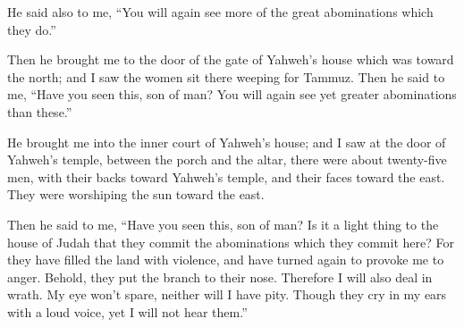 {He said also to me, “You will again see more of the great abominations which they do.”
\par }{\PP {}Then he brought me to the door of the gate of Yahweh’s house which was toward the north; and I saw the women sit there weeping for Tammuz.
Then he said to me, “Have you seen this, son of man? You will again see yet greater abominations than these.”
\par }{\PP {}He brought me into the inner court of Yahweh’s house; and I saw at the door of Yahweh’s temple, between the porch and the altar, there were about twenty-five men, with their backs toward Yahweh’s temple, and their faces toward the east. They were worshiping the sun toward the east.
\par }{\PP {}Then he said to me, “Have you seen this, son of man? Is it a light thing to the house of Judah that they commit the abominations which they commit here? For they have filled the land with violence, and have turned again to provoke me to anger. Behold, they put the branch to their nose.
Therefore I will also deal in wrath. My eye won’t spare, neither will I have pity. Though they cry in my ears with a loud voice, yet I will not hear them.”

}
